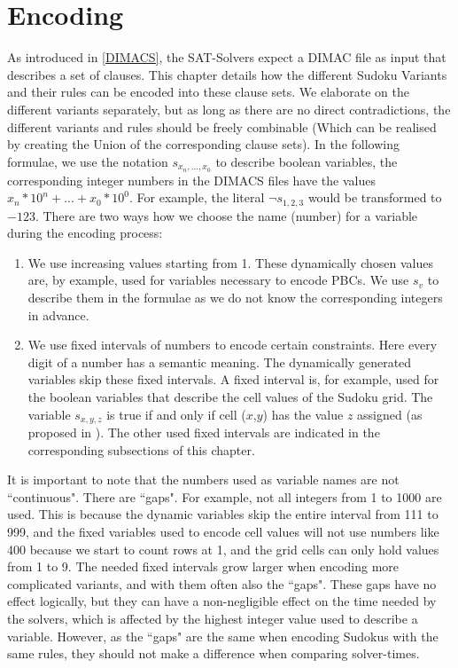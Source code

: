 \chapter{Encoding}\label{Encoding}
As introduced in \ref{DIMACS}, the SAT-Solvers expect a DIMAC file as input that describes a set of clauses. This chapter details how the different Sudoku Variants and their rules can be encoded into these clause sets. We elaborate on the different variants separately, but as long as there are no direct contradictions, the different variants and rules should be freely combinable (Which can be realised by creating the Union of the corresponding clause sets). In the following formulae, we use the notation $s_{x_{n},...,x_{0}}$ to describe boolean variables, the corresponding integer numbers in the DIMACS files have the values $x_{n}*10^{n}+...+x_{0}*10^{0}$. For example, the literal $\neg s_{1,2,3}$ would be transformed to $-123$. There are two ways how we choose the name (number) for a variable during the encoding process:

\begin{enumerate}
    \item We use increasing values starting from 1. These dynamically chosen values are, by example, used for variables necessary to encode PBCs. We use $s_{v}$ to describe them in the formulae as we do not know the corresponding integers in advance.
    \item  We use fixed intervals of numbers to encode certain constraints. Here every digit of a number has a semantic meaning. The dynamically generated variables skip these fixed intervals. A fixed interval is, for example, used for the boolean variables that describe the cell values of the Sudoku grid. The variable $s_{x,y,z}$ is true if and only if cell ($x$,$y$) has the value $z$ assigned (as proposed in \cite{Lynce2006SudokuAsASATProblem}). The other used fixed intervals are indicated in the corresponding subsections of this chapter. 
\end{enumerate}

It is important to note that the numbers used as variable names are not ``continuous". There are ``gaps". For example, not all integers from 1 to 1000 are used. This is because the dynamic variables skip the entire interval from 111 to 999, and the fixed variables used to encode cell values will not use numbers like 400 because we start to count rows at 1, and the grid cells can only hold values from 1 to 9. The needed fixed intervals grow larger when encoding more complicated variants, and with them often also the ``gaps". These gaps have no effect logically, but they can have a non-negligible effect on the time needed by the solvers, which is affected by the highest integer value used to describe a variable. However, as the ``gaps" are the same when encoding Sudokus with the same rules, they should not make a difference when comparing solver-times.


